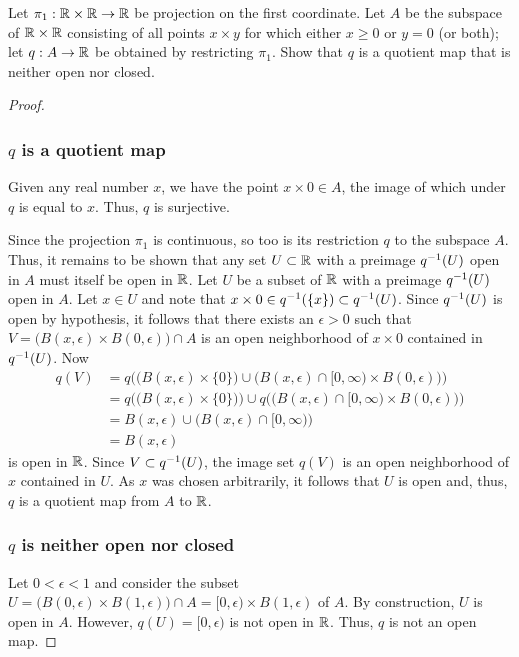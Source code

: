 %
\begin{exercise}[ID=2.22.3]
  Let $\pi_1: \mathbb{R} \times \mathbb{R} \rightarrow \mathbb{R}$ be projection on the first coordinate.
  Let $A$ be the subspace of $\mathbb{R} \times \mathbb{R}$ consisting of all points $x \times y$ for which either $x \geq 0$ or $y = 0$ (or both);
  let $q: A \rightarrow \mathbb{R}$ be obtained by restricting $\pi_1$.
  Show that $q$ is a quotient map that is neither open nor closed.
\end{exercise}
\begin{solution}
  \begin{proof}~

    \subsubsection*{$q$ is a quotient map}
    Given any real number $x$, we have the point $x \times 0 \in A$, the image of which under $q$ is equal to $x$.
    Thus, $q$ is surjective.

    Since the projection $\pi_1$ is continuous, so too is its restriction $q$ to the subspace $A$.
    Thus, it remains to be shown that any set $U \subset \mathbb{R}$ with a preimage $q^{-1}(U)$ open in $A$ must itself be open in $\mathbb{R}$.
    Let $U$ be a subset of $\mathbb{R}$ with a preimage $q^{-1}(U)$ open in $A$.
    Let $x \in U$ and note that $x \times 0 \in q^{-1}(\{x\}) \subset q^{-1}(U)$.
    Since $q^{-1}(U)$ is open by hypothesis, it follows that there exists an $\epsilon > 0$ such that $V = \big(B(x, \epsilon) \times B(0, \epsilon)\big) \cap A$ is an open neighborhood of $x \times 0$ contained in $q^{-1}(U)$.
    Now
    \begin{align*}
      q(V)  &= q\Big(\big(B(x, \epsilon) \times \{0\}\big) \cup \big(B(x, \epsilon) \cap [0, \infty) \times B(0, \epsilon)\big)\Big) \\
            &= q\Big(\big(B(x, \epsilon) \times \{0\}\big)\Big) \cup q\Big(\big(B(x, \epsilon) \cap [0, \infty) \times B(0, \epsilon)\big)\Big) \\
            &= B(x, \epsilon) \cup \big(B(x, \epsilon) \cap [0, \infty)\big) \\
            &= B(x, \epsilon)
    \end{align*}
    is open in $\mathbb{R}$.
    Since $V \subset q^{-1}(U)$, the image set $q(V)$ is an open neighborhood of $x$ contained in $U$.
    As $x$ was chosen arbitrarily, it follows that $U$ is open and, thus, $q$ is a quotient map from $A$ to $\mathbb{R}$.
    \bigskip

    \subsubsection*{$q$ is neither open nor closed}
    Let $0 < \epsilon < 1$ and consider the subset $U = \big(B(0, \epsilon) \times B(1, \epsilon)\big) \cap A = [0, \epsilon) \times B(1, \epsilon)$ of $A$.
    By construction, $U$ is open in $A$.
    However, $q(U) = [0, \epsilon)$ is not open in $\mathbb{R}$.
    Thus, $q$ is not an open map.


\end{proof}
\end{solution}
